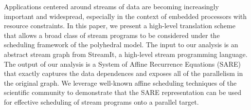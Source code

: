 Applications centered around streams of data are becoming increasingly
important and widespread, especially in the context of embedded
processors with resource constraints.  In this paper, we present a
high-level translation scheme that allows a broad class of stream
programs to be considered under the scheduling framework of the
polyhedral model.  The input to our analysis is an abstract stream
graph from StreamIt, a high-level stream programming language.  The
output of our analysis is a System of Affine Recurrence Equations
(SARE) that exactly captures the data dependences and exposes all of
the parallelism in the original graph.  We leverage well-known affine
scheduling techniques of the scientific community to demonstrate that
the SARE representation can be used for effective scheduling of stream
programs onto a parallel target.
